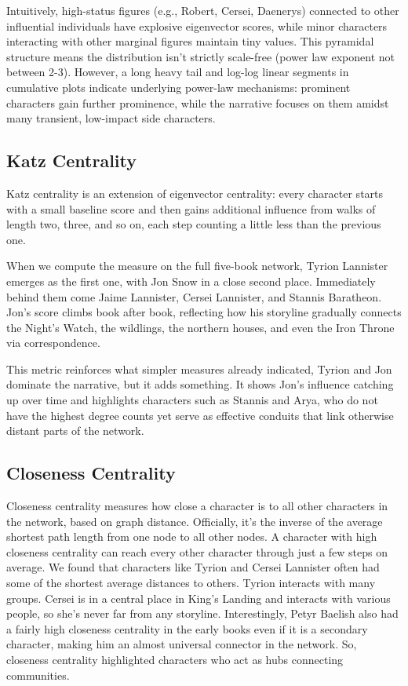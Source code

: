 \documentclass[12pt, a4paper]{article}
\begin{document}
	Intuitively, high-status figures (e.g., Robert, Cersei, Daenerys) connected to other influential individuals have explosive eigenvector scores, while minor characters interacting with other marginal figures maintain tiny values. This pyramidal structure means the distribution isn't strictly scale-free (power law exponent not between 2-3). However, a long heavy tail and log-log linear segments in cumulative plots indicate underlying power-law mechanisms: prominent characters gain further prominence, while the narrative focuses on them amidst many transient, low-impact side characters.

	\subsection*{Katz Centrality}
	Katz centrality is an extension of eigenvector centrality:
	every character starts with a small baseline score and then
	gains additional influence from walks of length two, three, 
	and so on, each step counting a little less than the previous one. 
	
	
	When we compute the measure on the full five-book network, 
	Tyrion Lannister emerges as the first one,
	with Jon Snow in a close second place. 
	Immediately behind them come Jaime Lannister, 
	Cersei Lannister, and Stannis Baratheon. Jon's score climbs book 
	after book, reflecting how his storyline gradually connects the 
	Night's Watch, the wildlings, the northern houses, and even the 
	Iron Throne via correspondence. 
	
	This metric  reinforces what simpler measures already indicated, 
	Tyrion and Jon dominate the narrative, but it adds something. 
	It shows Jon's influence catching up over time and highlights 
	characters such as Stannis and Arya, who do not have the 
	highest degree counts yet serve as effective conduits that
	link otherwise distant parts of the network.
	
	
	\subsection*{Closeness Centrality}
	Closeness centrality measures how close a character is to all 
	other characters in the network, based on graph distance. 
	Officially, it's the inverse of the average shortest path length 
	from one node to all other nodes. A character with high closeness 
	centrality can reach every other character through just a few steps 
	on average. 
	We found that characters like Tyrion and 
	Cersei Lannister often had some of the shortest average 
	distances to others. Tyrion interacts with 
	many groups. Cersei is in a central place in King's Landing 
	and interacts with various people, so she's never far from any storyline. 
	Interestingly, Petyr Baelish also had a 
	fairly high closeness centrality in the early books even if it is a secondary character,
	making him an almost universal 
	connector in the network. So, closeness centrality 
	highlighted characters who act as hubs connecting 
	communities.
	
\end{document}
